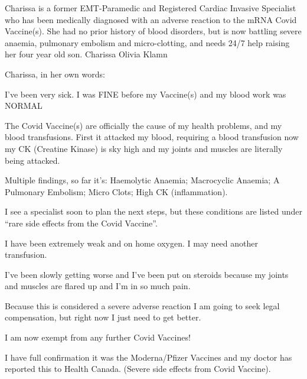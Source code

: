 Charissa is a former EMT-Paramedic and Registered Cardiac Invasive Specialist
who has been medically diagnosed with an adverse reaction to the mRNA Covid
Vaccine(s). She had no prior history of blood disorders, but is now battling
severe anaemia, pulmonary embolism and micro-clotting, and needs 24/7 help
raising her four year old son.  Charissa Olivia Klamn

Charissa, in her own words:

I’ve been very sick. I was FINE before my Vaccine(s) and my blood work was
NORMAL

The Covid Vaccine(s) are officially the cause of my health problems, and my
blood transfusions. First it attacked my blood, requiring a blood transfusion
now my CK (Creatine Kinase) is sky high and my joints and muscles are literally
being attacked.

Multiple findings, so far it’s: Haemolytic Anaemia; Macrocyclic Anaemia; A
Pulmonary Embolism; Micro Clots; High CK (inflammation).

I see a specialist soon to plan the next steps, but these conditions are listed
under “rare side effects from the Covid Vaccine”.

I have been extremely weak and on home oxygen. I may need another transfusion.

I’ve been slowly getting worse and I’ve been put on steroids because my joints
and muscles are flared up and I’m in so much pain.

Because this is considered a severe adverse reaction I am going to seek legal
compensation, but right now I just need to get better.

I am now exempt from any further Covid Vaccines!

I have full confirmation it was the Moderna/Pfizer Vaccines and my doctor has
reported this to Health Canada. (Severe side effects from Covid Vaccine).

